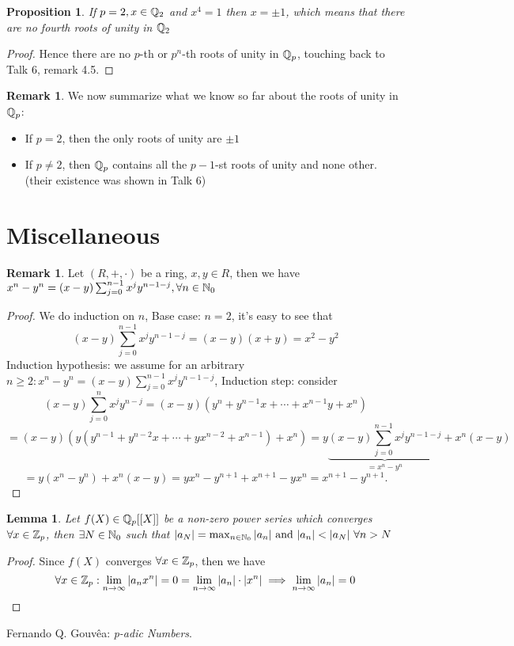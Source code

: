 \documentclass[a4paper]{article}
\theoremstyle{plain}
\newtheorem{lemm}[thm]{Lemma}
\newtheorem{prop}[thm]{Proposition}
\theoremstyle{definition}
\newtheorem{rem}[thm]{Remark}
\begin{document}
\begin{prop} If $p = 2, x \in \Bbb Q_{2}$ and $x^{4} = 1$ then $x = \pm 1$, which means that there are no fourth roots of unity in $\Bbb Q_{2}$
\end{prop}
\begin{proof}
  Hence there are no $p$-th or $p^{n}$-th roots of unity in $\Bbb Q_{p}$, touching back to Talk 6, remark 4.5.
\end{proof}
\begin{rem}
  We now summarize what we know so far about the roots of unity in $\Bbb Q_{p}$:
  \begin{itemize}
    \item If $p=2$, then the only roots of unity are $\pm 1$
    \item If $p \neq 2$, then $\Bbb Q_{p}$ contains all the $p-1$-st roots of unity and none other. (their existence was shown in Talk 6)
  \end{itemize}

\end{rem}
\section{Miscellaneous}
\begin{rem} %
  Let $(R, +, \cdot)$ be a ring, $x, y \in R$, then we have $x^{n}-y^{n} = (x-y)\sum_{j=0}^{n-1}x^{j}y^{n-1-j}, \forall n \in \Bbb N_{0}$
\end{rem}
\begin{proof} %
  We do induction on $n$,
  Base case: $n = 2$, it's easy to see that
  $$(x-y)\sum_{j=0}^{n-1}x^{j}y^{n-1-j} = (x-y)(x+y) = x^{2} - y^{2}$$
  Induction hypothesis: we assume for an arbitrary $n \geq 2: x^{n}-y^{n} = (x-y)\sum_{j=0}^{n-1}x^{j}y^{n-1-j}$,
  Induction step: consider
  $$(x-y)\sum_{j=0}^{n}x^{j}y^{n-j} = (x-y)(y^{n} + y^{n-1}x + \cdots + x^{n-1}y + x^{n})$$
  $$ = (x-y)(y(y^{n-1} + y^{n-2}x + \cdots + yx^{n-2} + x^{n-1}) + x^{n}) = y\underbrace{(x-y)\sum_{j=0}^{n-1}x^{j}y^{n-1-j}}_{= x^{n}-y^{n}} + x^{n}(x-y)$$
  $$ = y(x^{n} - y^{n}) + x^{n}(x-y) = yx^{n} - y^{n+1} + x^{n+1} - yx^{n} = x^{n+1} - y^{n+1}.$$
\end{proof}
\begin{lemm}
  Let $f(X) \in \Bbb Q_{p}[[X]]$ be a non-zero power series which converges $\forall x \in \Bbb Z_{p}$, then $\exists N \in \Bbb N_{0}$ such that $|a_{N}| = \max_{n \in \Bbb N_{0}}|a_{n}| \text{ and } |a_{n}| < |a_{N}|\ \forall n > N$
\end{lemm}
\begin{proof}
  Since $f(X)$ converges $\forall x \in \Bbb Z_{p}$, then we have
  $$\forall x \in \Bbb Z_{p} : \lim_{n \to \infty}|a_{n}x^{n}| = 0 = \lim_{n \to \infty}|a_{n}|\cdot|x^{n}| \implies \lim_{n \to \infty}|a_{n}| = 0$$
\end{proof}
\begin{thebibliography}{widest-label} %

	Fernando Q. Gouv\^{e}a:
	\emph{p-adic Numbers}.
\end{thebibliography}
\end{document}

